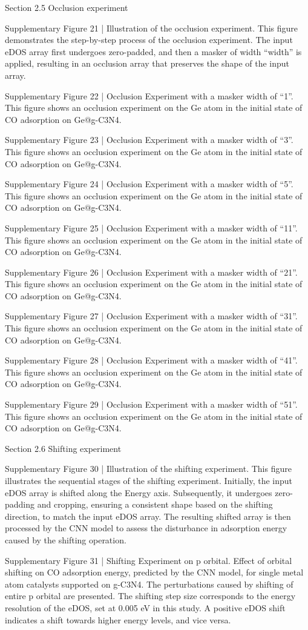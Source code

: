 Section 2.5 Occlusion experiment


Supplementary Figure 21 | Illustration of the occlusion experiment. This figure demonstrates the step-by-step process of the occlusion experiment. The input eDOS array first undergoes zero-padded, and then a masker of width “width” is applied, resulting in an occlusion array that preserves the shape of the input array.


Supplementary Figure 22 | Occlusion Experiment with a masker width of “1”. This figure shows an occlusion experiment on the Ge atom in the initial state of CO adsorption on Ge@g-C3N4.


Supplementary Figure 23 | Occlusion Experiment with a masker width of “3”. This figure shows an occlusion experiment on the Ge atom in the initial state of CO adsorption on Ge@g-C3N4.


Supplementary Figure 24 | Occlusion Experiment with a masker width of “5”. This figure shows an occlusion experiment on the Ge atom in the initial state of CO adsorption on Ge@g-C3N4.

Supplementary Figure 25 | Occlusion Experiment with a masker width of “11”. This figure shows an occlusion experiment on the Ge atom in the initial state of CO adsorption on Ge@g-C3N4.


Supplementary Figure 26 | Occlusion Experiment with a masker width of “21”. This figure shows an occlusion experiment on the Ge atom in the initial state of CO adsorption on Ge@g-C3N4.

Supplementary Figure 27 | Occlusion Experiment with a masker width of “31”. This figure shows an occlusion experiment on the Ge atom in the initial state of CO adsorption on Ge@g-C3N4.


Supplementary Figure 28 | Occlusion Experiment with a masker width of “41”. This figure shows an occlusion experiment on the Ge atom in the initial state of CO adsorption on Ge@g-C3N4.

Supplementary Figure 29 | Occlusion Experiment with a masker width of “51”. This figure shows an occlusion experiment on the Ge atom in the initial state of CO adsorption on Ge@g-C3N4.


Section 2.6 Shifting experiment


Supplementary Figure 30 | Illustration of the shifting experiment. This figure illustrates the sequential stages of the shifting experiment. Initially, the input eDOS array is shifted along the Energy axis. Subsequently, it undergoes zero-padding and cropping, ensuring a consistent shape based on the shifting direction, to match the input eDOS array. The resulting shifted array is then processed by the CNN model to assess the disturbance in adsorption energy caused by the shifting operation.


Supplementary Figure 31 | Shifting Experiment on p orbital. Effect of orbital shifting on CO adsorption energy, predicted by the CNN model, for single metal atom catalysts supported on g-C3N4. The perturbations caused by shifting of entire p orbital are presented. The shifting step size corresponds to the energy resolution of the eDOS, set at 0.005 eV in this study. A positive eDOS shift indicates a shift towards higher energy levels, and vice versa.
